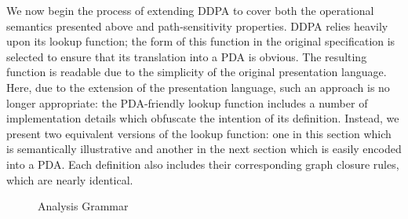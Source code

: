 \documentclass[nocopyright]{sigplanconf}
\begin{document}
We now begin the process of extending DDPA to cover both the operational semantics presented above and path-sensitivity properties.  DDPA relies heavily upon its lookup function; the form of this function in the original specification is selected to ensure that its translation into a PDA is obvious.  The resulting function is readable due to the simplicity of the original presentation language.  Here, due to the extension of the presentation language, such an approach is no longer appropriate: the PDA-friendly lookup function includes a number of implementation details which obfuscate the intention of its definition.  Instead, we present two equivalent versions of the lookup function: one in this section which is semantically illustrative and another in the next section which is easily encoded into a PDA.  Each definition also includes their corresponding graph closure rules, which are nearly identical.

\begin{figure}
    \begin{grammar}
    \end{grammar}
    \caption{Analysis Grammar}
    \label{fig_analysisGrammar}
\end{figure}
\end{document}
